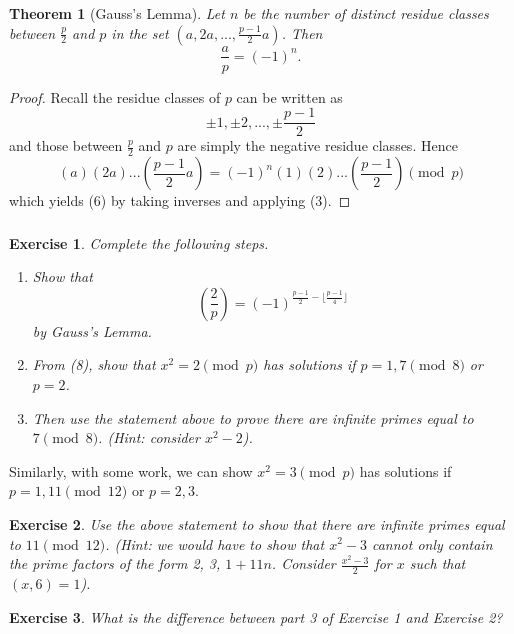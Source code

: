 \documentclass{article}
\newtheorem{theorem}{Theorem}
\newtheorem{exercise}{Exercise}
\newcommand{\legendre}[2]{\genfrac{(}{)}{}{}{#1}{#2}}
\begin{document}
\subsubsection{}
\begin{theorem}[Gauss's Lemma]
Let $n$ be the number of distinct residue classes between $\frac{p}{2}$ and $p$ in the set $(a, 2a, ..., \frac{p-1}{2}a)$. Then 
    \begin{equation}
        \frac{a}{p} = (-1)^{n}.
    \end{equation}
\end{theorem}
\begin{proof}
Recall the residue classes of $p$ can be written as
\begin{equation*}
    {\pm1, \pm2, ..., \pm \frac{p-1}{2}}
\end{equation*}
and those between $\frac{p}{2}$ and $p$ are simply the negative residue classes. Hence
\begin{equation}
    (a)(2a)...(\frac{p-1}{2}a) = (-1)^{n}(1)(2)...(\frac{p-1}{2}) \pmod{p}
\end{equation}
which yields (6) by taking inverses and applying (3).
\end{proof}

\subsubsection{}
\begin{exercise}
    Complete the following steps.
    \begin{enumerate}
        \item Show that
        \begin{equation}
            \legendre{2}{p} = (-1)^{\frac{p-1}{2} - \lfloor\frac{p-1}{4}\rfloor}
        \end{equation}
        by Gauss's Lemma.
        \item From (8), show that $x^{2} = 2 \pmod{p}$ has solutions if $p = 1, 7 \pmod{8}$ or $p = 2$.
        \item Then use the statement above to prove there are infinite primes equal to $7 \pmod{8}$. (Hint: consider $x^{2} - 2$).
    \end{enumerate}
\end{exercise}
Similarly, with some work, we can show $x^{2} = 3 \pmod{p}$ has solutions if $p = 1, 11 \pmod{12}$ or $p = 2, 3$.
\begin{exercise}
    Use the above statement to show that there are infinite primes equal to $11 \pmod{12}$. (Hint: we would have to show that $x^{2} - 3$ cannot only contain the prime factors of the form 2, 3, $1 + 11n$. Consider $\frac{x^{2} - 3}{2}$ for $x$ such that $(x,6) = 1$).
\end{exercise}
\begin{exercise}
    What is the difference between part 3 of Exercise 1 and Exercise 2?
\end{exercise}
\end{document}
